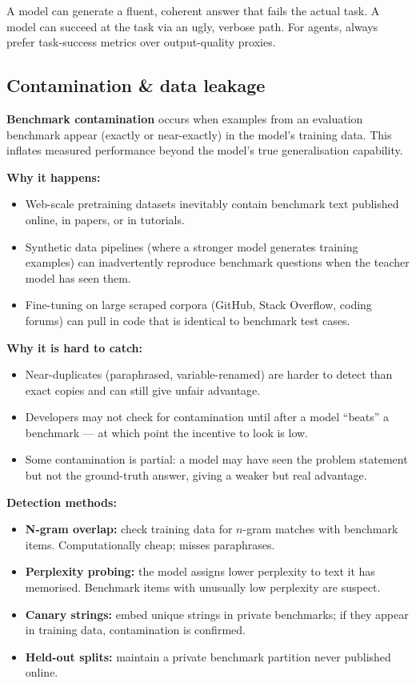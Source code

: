 \begin{intuitionbox}[title=Key distinction: output quality vs task success]
  A model can generate a fluent, coherent answer that fails the actual task. A model
  can succeed at the task via an ugly, verbose path. For agents, always prefer
  task-success metrics over output-quality proxies.
\end{intuitionbox}

\subsection{Contamination \& data leakage}

\textbf{Benchmark contamination} occurs when examples from an evaluation benchmark
appear (exactly or near-exactly) in the model's training data. This inflates measured
performance beyond the model's true generalisation capability.

\textbf{Why it happens:}
\begin{itemize}
  \item Web-scale pretraining datasets inevitably contain benchmark text published
    online, in papers, or in tutorials.
  \item Synthetic data pipelines (where a stronger model generates training examples)
    can inadvertently reproduce benchmark questions when the teacher model has seen them.
  \item Fine-tuning on large scraped corpora (GitHub, Stack Overflow, coding forums)
    can pull in code that is identical to benchmark test cases.
\end{itemize}

\textbf{Why it is hard to catch:}
\begin{itemize}
  \item Near-duplicates (paraphrased, variable-renamed) are harder to detect than
    exact copies and can still give unfair advantage.
  \item Developers may not check for contamination until after a model ``beats''
    a benchmark --- at which point the incentive to look is low.
  \item Some contamination is partial: a model may have seen the problem statement
    but not the ground-truth answer, giving a weaker but real advantage.
\end{itemize}

\textbf{Detection methods:}
\begin{itemize}
  \item \textbf{N-gram overlap:} check training data for $n$-gram matches with
    benchmark items. Computationally cheap; misses paraphrases.
  \item \textbf{Perplexity probing:} the model assigns lower perplexity to text it
    has memorised. Benchmark items with unusually low perplexity are suspect.
  \item \textbf{Canary strings:} embed unique strings in private benchmarks; if they
    appear in training data, contamination is confirmed.
  \item \textbf{Held-out splits:} maintain a private benchmark partition never
    published online.
\end{itemize}

